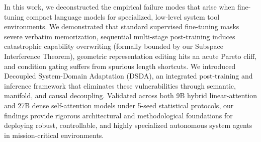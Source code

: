 \documentclass{article}
\begin{document}
In this work, we deconstructed the empirical failure modes that arise when fine-tuning compact language models for specialized, low-level system tool environments. We demonstrated that standard supervised fine-tuning masks severe verbatim memorization, sequential multi-stage post-training induces catastrophic capability overwriting (formally bounded by our Subspace Interference Theorem), geometric representation editing hits an acute Pareto cliff, and condition gating suffers from spurious length shortcuts. We introduced Decoupled System-Domain Adaptation (DSDA), an integrated post-training and inference framework that eliminates these vulnerabilities through semantic, manifold, and causal decoupling. Validated across both 9B hybrid linear-attention and 27B dense self-attention models under 5-seed statistical protocols, our findings provide rigorous architectural and methodological foundations for deploying robust, controllable, and highly specialized autonomous system agents in mission-critical environments.



\end{document}
